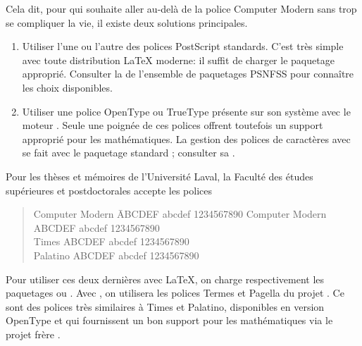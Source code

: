 Cela dit, pour qui souhaite aller au-delà de la police Computer Modern
sans trop se compliquer la vie, il existe deux solutions principales.

\begin{enumerate}
\item Utiliser l'une ou l'autre des polices PostScript standards.
  C'est très simple avec toute distribution {\LaTeX} moderne: il
  suffit de charger le paquetage approprié. Consulter la %
  de l'ensemble de paquetages PSNFSS pour connaître les choix
  disponibles.
\item Utiliser une police OpenType ou TrueType présente sur son système avec le
  moteur {\XeLaTeX}. Seule une poignée de ces polices offrent
  toutefois un support approprié pour les mathématiques. La gestion
  des polices de caractères avec {\XeLaTeX} se fait avec le paquetage
  standard ; consulter sa %
  .
\end{enumerate}

Pour les thèses et mémoires de l'Université Laval, la Faculté des
études supérieures et postdoctorales accepte les polices %
\begin{quote}
  \begin{tabbing}
    Computer Modern \qquad \=  ABCDEF abcdef 1234567890 \kill
    {\CM Computer Modern} \> {\CM ABCDEF abcdef 1234567890} \\
    {\Times Times} \> {\Times ABCDEF abcdef 1234567890} \\
    {\Palatino Palatino} \> {\Palatino ABCDEF abcdef 1234567890}
  \end{tabbing}
\end{quote}
Pour utiliser ces deux dernières avec {\LaTeX}, on charge
respectivement les paquetages  ou . Avec
{\XeLaTeX}, on utilisera les polices Termes et Pagella du projet %
.
Ce sont des polices très similaires à Times et Palatino, disponibles
en version OpenType et qui fournissent un bon support pour les
mathématiques via le projet frère %
.

